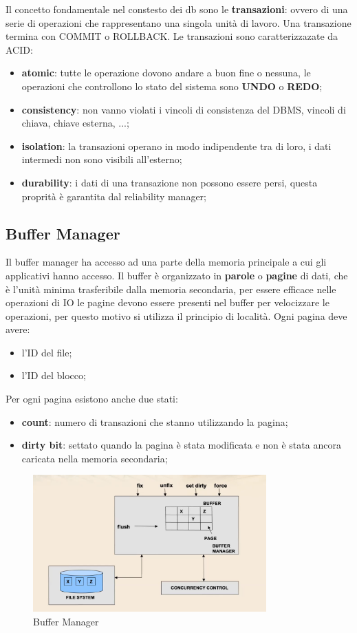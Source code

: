 \documentclass[12pt]{article}
\begin{document}
Il concetto fondamentale nel constesto dei db sono le \textbf{transazioni}: ovvero di una serie di operazioni che rappresentano una singola unit\`a  di lavoro. Una transazione termina con COMMIT o ROLLBACK. Le transazioni sono caratterizzazate da ACID:
\begin{itemize}
    \item \textbf{atomic}: tutte le operazione dovono andare a buon fine o nessuna, le operazioni che controllono lo stato del sistema sono \textbf{UNDO} o \textbf{REDO};
    \item \textbf{consistency}: non vanno violati i vincoli di consistenza del DBMS, vincoli di chiava, chiave esterna, ...;
    \item \textbf{isolation}: la transazioni operano in modo indipendente tra di loro, i dati intermedi non sono visibili all'esterno;
    \item \textbf{durability}: i dati di una transazione non possono essere persi, questa proprit\`a \`e garantita dal reliability manager;
\end{itemize}


\subsection{Buffer Manager}
Il buffer manager ha accesso ad una parte della memoria principale a cui gli applicativi hanno accesso. Il buffer \`e organizzato in \textbf{parole} o \textbf{pagine} di dati, che \`e l'unit\`a minima trasferibile dalla memoria secondaria, per essere efficace nelle operazioni di IO le pagine devono essere presenti nel buffer per velocizzare le operazioni, per questo motivo si utilizza il principio di localit\`a. Ogni pagina deve avere:
\begin{itemize}
    \item l'ID del file;
    \item l'ID del blocco;
\end{itemize}
Per ogni pagina esistono anche due stati:
\begin{itemize}
    \item \textbf{count}: numero di transazioni che stanno utilizzando la pagina;
    \item \textbf{dirty bit}: settato quando la pagina \`e stata modificata e non \`e stata ancora caricata nella memoria secondaria;
\end{itemize}
\begin{figure}[H]
    \centering
    \includegraphics[width=0.8\textwidth]{buffer-manager.png}
    \caption{Buffer Manager}
    \label{fig:buffer-manager}
\end{figure}
\end{document}
